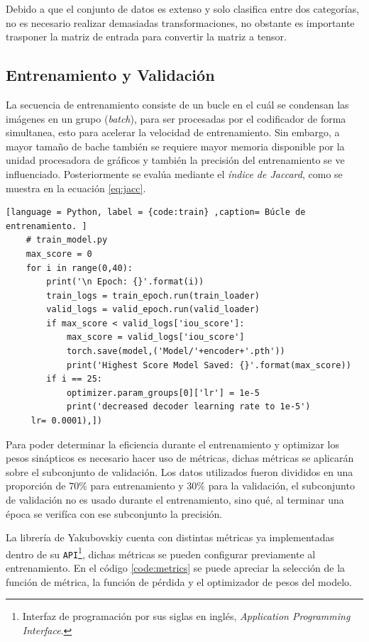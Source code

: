 Debido a que el conjunto de datos es extenso y solo clasifica entre dos categorías, no es necesario realizar demasiadas transformaciones, no obstante es importante trasponer la matriz de entrada para convertir la matriz a tensor.

\subsection{Entrenamiento y Validación}
La secuencia de entrenamiento consiste de un bucle en el cuál se condensan las imágenes en un grupo (\emph{batch}), para ser procesadas por el codificador de forma simultanea, esto para acelerar la velocidad de entrenamiento. Sin embargo, a mayor tamaño de bache también se requiere mayor memoria disponible por la unidad procesadora de gráficos y también la precisión del entrenamiento se ve influenciado. Posteriormente se evalúa mediante el \emph{índice de Jaccard}, como se muestra en la ecuación \ref{eq:jacc}.

\begin{lstlisting}[language = Python, label = {code:train} ,caption= Búcle de entrenamiento. ]
    # train_model.py
    max_score = 0 
    for i in range(0,40):
        print('\n Epoch: {}'.format(i))
        train_logs = train_epoch.run(train_loader)
        valid_logs = valid_epoch.run(valid_loader)
        if max_score < valid_logs['iou_score']:
            max_score = valid_logs['iou_score']
            torch.save(model,('Model/'+encoder+'.pth'))
            print('Highest Score Model Saved: {}'.format(max_score))
        if i == 25:
            optimizer.param_groups[0]['lr'] = 1e-5
            print('decreased decoder learning rate to 1e-5')
     lr= 0.0001),])
\end{lstlisting}

Para poder determinar la eficiencia durante el entrenamiento y optimizar los pesos sinápticos es necesario hacer uso de métricas, dichas métricas se aplicarán sobre el subconjunto de validación. Los datos utilizados fueron divididos en una proporción de $70\%$ para entrenamiento y $30\%$ para la validación, el subconjunto de validación no es usado durante el entrenamiento, sino qué, al terminar una época se verifíca con ese subconjunto la precisión.

La librería de Yakubovskiy \citep{Yakubovskiy:2019} cuenta con distintas métricas ya implementadas dentro de su \texttt{API}\footnote{Interfaz de programación por sus siglas en inglés, \emph{Application Programming Interface}.}, dichas métricas se pueden configurar previamente al entrenamiento. En el código \ref{code:metrics} se puede apreciar la selección de la función de métrica, la función de pérdida y el optimizador de pesos del modelo.

